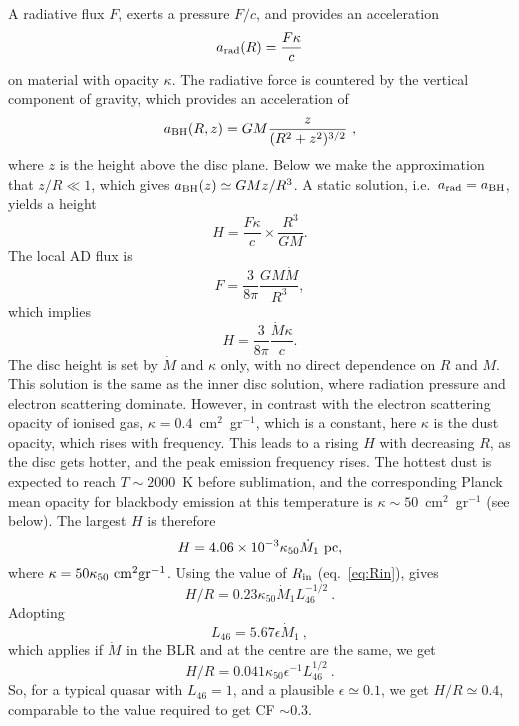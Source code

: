 \documentclass[a4paper,fleqn,usenatbib]{mnras}
\newcommand{\mdot}{\dot{M}}
\begin{document}
A radiative flux $F$, exerts a pressure $F/c$, and provides
an acceleration 
\begin{equation}
a_{\rm rad}(R)=\frac{F\kappa}{c} 
\end{equation}
on material with opacity $\kappa$. The radiative force is countered by the vertical
component of gravity, which provides an acceleration of 
\begin{equation}
a_{\rm BH}(R,z)=GM\frac{z}{(R^2+z^2)^{3/2}}\ , 
\label{eq:a_gz}
\end{equation}
where $z$ is the height above the disc plane. Below we make the approximation that  
$z/R\ll 1$, which gives $a_{\rm BH}(z)\simeq GMz/R^3$. A static solution, 
i.e.\ $a_{\rm rad}=a_{\rm BH}$,  yields a height
\begin{equation}
H=\frac{F\kappa}{c}\times \frac{R^3}{GM}.
\end{equation}
The local AD flux is
\begin{equation}
F=\frac{3}{8\pi}\frac{GM\mdot}{R^3} ,
\label{eq:ADflux}
\end{equation}
which implies 
\begin{equation}
H=\frac{3}{8\pi}\frac{\mdot \kappa}{c} .
\label{eq:H_mdot}
\end{equation}
The disc height is set by $\mdot$ and $\kappa$ only, with no direct dependence on $R$ and $M$. 
This solution is the same as the
\citet{SS73} inner disc solution, where radiation pressure and electron scattering dominate.
However, in contrast with the electron scattering opacity of ionised gas, 
$\kappa=0.4$~cm$^2$~gr$^{-1}$, which is a constant, here $\kappa$ is the dust opacity, which rises with frequency. This leads to a rising $H$ with decreasing $R$, as the disc
gets hotter, and the peak emission frequency rises.
The hottest dust is expected to reach $T\sim 2000$~K before sublimation, and the corresponding Planck
mean opacity for blackbody emission at this temperature is $\kappa \sim 50$~cm$^2$~gr$^{-1}$ (see below).
The largest $H$ is therefore   
\begin{equation}  
H=4.06\times 10^{-3}\kappa_{50}\mdot_1~{\rm pc} ,
\label{eq:H1}
\end{equation}
where $\kappa=50\kappa_{50}~{\rm cm}^2{\rm gr}^{-1}$. Using the value of $R_{\rm in}$ (eq.~\ref{eq:Rin}),
gives
\begin{equation}  
H/R=0.23\kappa_{50}\mdot_1 L_{46}^{-1/2}\ .
\label{eq:CF}
\end{equation}
Adopting
\begin{equation}
L_{46}=5.67\epsilon \mdot_1\ ,
\label{eq:epsilon} 
\end{equation}
which applies if $\mdot$ in the BLR and at the centre are the same,
we get
\begin{equation}  
H/R=0.041\kappa_{50}\epsilon^{-1}L_{46}^{1/2}\ .
\label{eq:CF1}
\end{equation}
So, for a typical quasar with $L_{46}=1$, and a plausible $\epsilon\simeq 0.1$, 
we get $H/R\simeq 0.4$, comparable to the value required to get CF $\sim 0.3$.
\end{document}
